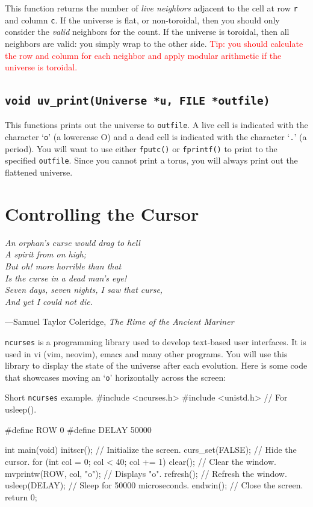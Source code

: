 \documentclass[11pt]{article}
\begin{document}
This function returns the number of \emph{live neighbors} adjacent to the cell
at row \texttt{r} and column \texttt{c}. If the universe is flat, or
non-toroidal, then you should only consider the \emph{valid} neighbors for the count.
If the universe is toroidal, then all neighbors are valid: you simply wrap to
the other side. \textcolor{red}{Tip: you should calculate the row and column for
each neighbor and apply modular arithmetic if the universe is toroidal.}


\subsection{\texttt{void uv\_print(Universe *u, FILE *outfile)}}

This functions prints out the universe to \texttt{outfile}. A live cell is
indicated with the character `\texttt{o}' (a lowercase O) and a dead cell is
indicated with the character `\texttt{.}' (a period). You will want to use
either \texttt{fputc()} or \texttt{fprintf()} to print to the specified
\texttt{outfile}. Since you cannot print a torus, you will always print out the
flattened universe.


\section{Controlling the Cursor}
\textwidth
\epigraph{\emph{An orphan's curse would drag to hell \\
A spirit from on high; \\
But oh! more horrible than that \\
Is the curse in a dead man's eye! \\
Seven days, seven nights, I saw that curse, \\
And yet I could not die.}}{---Samuel Taylor Coleridge, \emph{The Rime of the Ancient Mariner}}

\texttt{ncurses} is a programming library used to develop text-based user
interfaces. It is used in vi (vim, neovim), emacs and many other programs.
You will use this library to display the state of the universe after
each evolution. Here is some code that showcases moving an `\texttt{o}'
horizontally across the screen:

\begin{codelisting}{Short \texttt{ncurses} example.}
#include <ncurses.h>
#include <unistd.h> // For usleep().

#define ROW 0
#define DELAY 50000

int main(void) {
    initscr(); // Initialize the screen.
    curs_set(FALSE); // Hide the cursor.
    for (int col = 0; col < 40; col += 1) {
        clear(); // Clear the window.
        mvprintw(ROW, col, "o"); // Displays "o".
        refresh(); // Refresh the window.
        usleep(DELAY); // Sleep for 50000 microseconds.
    }
    endwin(); // Close the screen.
    return 0;
}
\end{codelisting}
\end{document}
